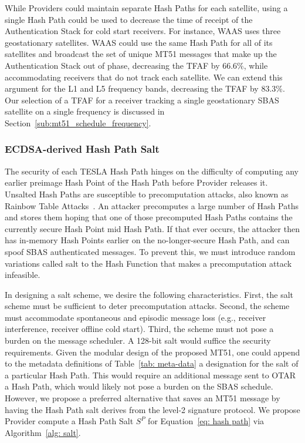 \documentclass[letterpaper,times]{IONconf/IONconf}
\begin{document}
		While Providers could maintain separate Hash Paths for each satellite, using a single Hash Path could be used to decrease the time of receipt of the Authentication Stack for cold start receivers.
		For instance, WAAS uses three geostationary satellites.
		WAAS could use the same Hash Path for all of its satellites and broadcast the set of unique MT51 messages that make up the Authentication Stack out of phase, decreasing the TFAF by 66.6\%, while accommodating receivers that do not track each satellite.
		We can extend this argument for the L1 and L5 frequency bands, decreasing the TFAF by 83.3\%.
		Our selection of a TFAF for a receiver tracking a single geostationary SBAS satellite on a single frequency is discussed in Section~\ref{sub:mt51_schedule_frequency}.

		\subsubsection{ECDSA-derived Hash Path Salt} \label{subsub:ecdsa_salt}

			The security of each TESLA Hash Path hinges on the difficulty of computing any earlier preimage Hash Point of the Hash Path before Provider releases it.
			Unsalted Hash Paths are susceptible to precomputation attacks, also known as Rainbow Table Attacks~\cite{boneh2017graduate}.
			An attacker precomputes a large number of Hash Paths and stores them hoping that one of those precomputed Hash Paths contains the currently secure Hash Point mid Hash Path.
			If that ever occurs, the attacker then has in-memory Hash Points earlier on the no-longer-secure Hash Path, and can spoof SBAS authenticated messages.
			To prevent this, we must introduce random variations called salt to the Hash Function that makes a precomputation attack infeasible.

			In designing a salt scheme, we desire the following characteristics.
			First, the salt scheme must be sufficient to deter precomputation attacks.
			Second, the scheme must accommodate spontaneous and episodic message loss (e.g., receiver interference, receiver offline cold start).
			Third, the scheme must not pose a burden on the message scheduler.
			A 128-bit salt would suffice the security requirements.
			Given the modular design of the proposed MT51, one could append to the metadata definitions of Table~\ref{tab: meta-data} a designation for the salt of a particular Hash Path.
			This would require an additional message sent to OTAR a Hash Path, which would likely not pose a burden on the SBAS schedule.
			However, we propose a preferred alternative that saves an MT51 message by having the Hash Path salt derives from the level-2 signature protocol.
			We propose Provider compute a Hash Path Salt $S^P$ for Equation~\eqref{eq: hash path} via Algorithm~\ref{alg: salt}.
\end{document}
